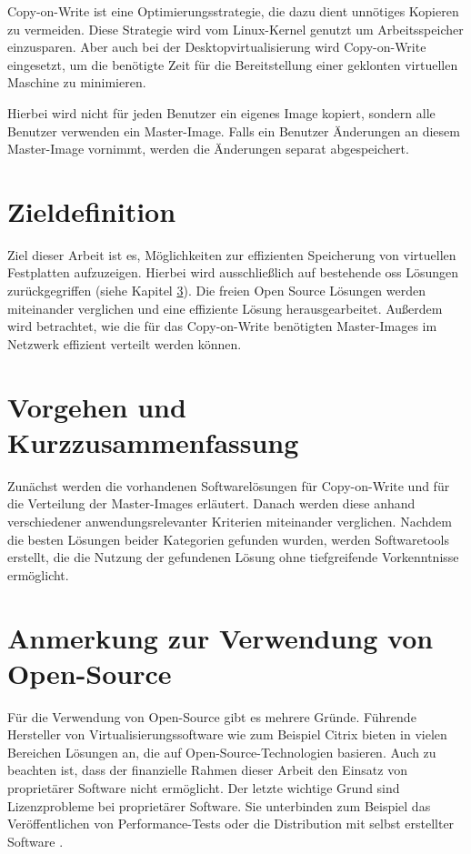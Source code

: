 {\fontsize{11.9pt}{14pt}\selectfont
Copy-on-Write ist eine Optimierungsstrategie, die dazu dient unnötiges Kopieren zu vermeiden. Diese Strategie wird vom Linux-Kernel genutzt um Arbeitsspeicher einzusparen. Aber auch bei der Desktopvirtualisierung wird Copy-on-Write eingesetzt, um die benötigte Zeit für die Bereitstellung einer geklonten virtuellen Maschine zu minimieren.
\begin{comment}Zusätzlich werden die Systemressourcen (Storage, IO, CPU) des physikalischen Virtualisierungsservers geschont.\end{comment}
Hierbei wird nicht für jeden Benutzer ein eigenes Image kopiert, sondern alle Benutzer verwenden ein Master-Image. Falls ein Benutzer Änderungen an diesem Master-Image vornimmt, werden die Änderungen separat abgespeichert. 

\section{Zieldefinition}
Ziel dieser Arbeit ist es, Möglichkeiten zur effizienten Speicherung von virtuellen Festplatten aufzuzeigen. Hierbei wird ausschließlich auf bestehende \gls{oss} Lösungen zurückgegriffen (siehe Kapitel \ref{opensource}). Die freien Open Source Lösungen werden miteinander verglichen und eine effiziente Lösung herausgearbeitet. Außerdem wird betrachtet, wie die für das Copy-on-Write benötigten Master-Images im Netzwerk effizient verteilt werden können.  

\section{Vorgehen und Kurzzusammenfassung} 
Zunächst werden die vorhandenen Softwarelösungen für Copy-on-Write und für die Verteilung der Master-Images erläutert. Danach werden diese anhand verschiedener anwendungsrelevanter Kriterien miteinander verglichen. Nachdem die besten Lösungen beider Kategorien gefunden wurden, werden Softwaretools erstellt, die die Nutzung der gefundenen Lösung ohne tiefgreifende Vorkenntnisse ermöglicht.}

\section{Anmerkung zur Verwendung von Open-Source}\label{opensource}
Für die Verwendung von Open-Source gibt es mehrere Gründe. Führende Hersteller von Virtualisierungssoftware wie zum Beispiel Citrix bieten in vielen Bereichen Lösungen an, die auf Open-Source-Technologien basieren. Auch zu beachten ist, dass der finanzielle Rahmen dieser Arbeit den Einsatz von proprietärer Software nicht ermöglicht. Der letzte wichtige Grund sind Lizenzprobleme bei proprietärer Software. Sie unterbinden zum Beispiel das Veröffentlichen von Performance-Tests oder die Distribution mit selbst erstellter Software \cite{Vmware}. 

